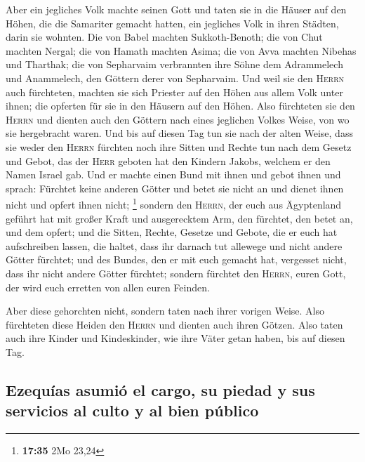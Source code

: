  Aber ein jegliches Volk machte seinen Gott und taten sie
in die Häuser auf den Höhen, die die Samariter gemacht hatten, ein
jegliches Volk in ihren Städten, darin sie wohnten.  Die
von Babel machten Sukkoth-Benoth; die von Chut machten Nergal; die von
Hamath machten Asima;  die von Avva machten Nibehas und
Tharthak; die von Sepharvaim verbrannten ihre Söhne dem Adrammelech und
Anammelech, den Göttern derer von Sepharvaim.  Und weil
sie den \textsc{Herrn} auch fürchteten, machten sie sich Priester auf
den Höhen aus allem Volk unter ihnen; die opferten für sie in den
Häusern auf den Höhen.  Also fürchteten sie den
\textsc{Herrn} und dienten auch den Göttern nach eines jeglichen Volkes
Weise, von wo sie hergebracht waren.  Und bis auf diesen
Tag tun sie nach der alten Weise, dass sie weder den \textsc{Herrn}
fürchten noch ihre Sitten und Rechte tun nach dem Gesetz und Gebot, das
der \textsc{Herr} geboten hat den Kindern Jakobs, welchem er den Namen
Israel gab.  Und er machte einen Bund mit ihnen und gebot
ihnen und sprach: Fürchtet keine anderen Götter und betet sie nicht an
und dienet ihnen nicht und opfert ihnen nicht; \footnote{\textbf{17:35}
  2Mo 23,24}  sondern den \textsc{Herrn}, der euch aus
Ägyptenland geführt hat mit großer Kraft und ausgerecktem Arm, den
fürchtet, den betet an, und dem opfert;  und die Sitten,
Rechte, Gesetze und Gebote, die er euch hat aufschreiben lassen, die
haltet, dass ihr darnach tut allewege und nicht andere Götter fürchtet;
 und des Bundes, den er mit euch gemacht hat, vergesset
nicht, dass ihr nicht andere Götter fürchtet;  sondern
fürchtet den \textsc{Herrn}, euren Gott, der wird euch erretten von
allen euren Feinden.

 Aber diese gehorchten nicht, sondern taten nach ihrer
vorigen Weise.  Also fürchteten diese Heiden den
\textsc{Herrn} und dienten auch ihren Götzen. Also taten auch ihre
Kinder und Kindeskinder, wie ihre Väter getan haben, bis auf diesen Tag.

\hypertarget{ezequuxedas-asumiuxf3-el-cargo-su-piedad-y-sus-servicios-al-culto-y-al-bien-puxfablico}{%
\subsection{Ezequías asumió el cargo, su piedad y sus servicios al culto
y al bien
público}\label{ezequuxedas-asumiuxf3-el-cargo-su-piedad-y-sus-servicios-al-culto-y-al-bien-puxfablico}}

